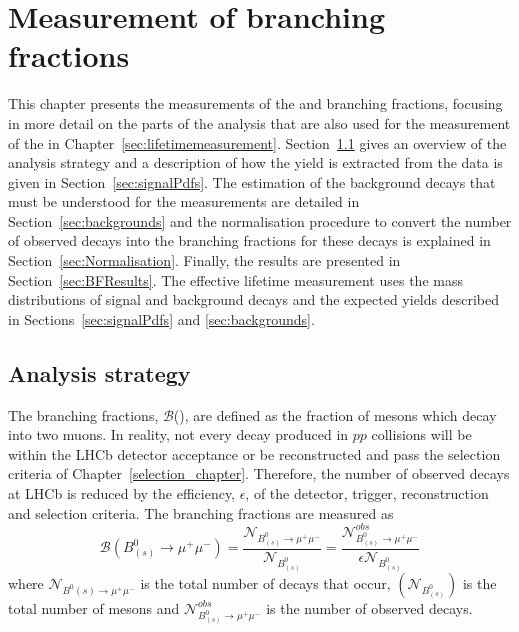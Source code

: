 \chapter{\bf{Measurement of }\boldmath{\bmumu}\bf{ branching fractions}}
\label{sec:BFanalysis}
This chapter presents the measurements of the \bdmumu and \bsmumu branching fractions, focusing in more detail on the parts of the analysis that are also used for the measurement of the \el in Chapter~\ref{sec:lifetimemeasurement}. Section~\ref{sec:BFAnalysisStrategy} gives an overview of the analysis strategy and a description of how the \bmumu yield is extracted from the data is given in Section~\ref{sec:signalPdfs}. The estimation of the background decays that must be understood for the \BF measurements are detailed in Section~\ref{sec:backgrounds} and the normalisation procedure to convert the number of observed \bmumu decays into the branching fractions for these decays is explained in Section~\ref{sec:Normalisation}. Finally, the results are presented in Section~\ref{sec:BFResults}. 
The \bsmumu effective lifetime measurement uses the mass distributions of signal and background decays and the expected yields described in Sections~\ref{sec:signalPdfs} and \ref{sec:backgrounds}. 

\section{Analysis strategy} 
\label{sec:BFAnalysisStrategy}
The \bmumu branching fractions, $\mathcal{B}$(\bmumu), are defined as the fraction of \bs mesons which decay into two muons.
In reality, not every \bmumu decay produced in $pp$ collisions will be within the LHCb detector acceptance or be reconstructed and pass the selection criteria of Chapter~\ref{selection_chapter}. Therefore, the number of observed \bmumu decays at LHCb is reduced by the efficiency, $\epsilon$, of the detector, trigger, reconstruction and selection criteria.
The \bmumu branching fractions are measured as
\begin{equation}
\mathcal{B}(B^{0}_{(s)} \to \mu^{+} \mu^{-}) = \frac{\mathcal{N}_{B^{0}_{(s)} \to \mu^{+} \mu^{-}}}{\mathcal{N}_{B^{0}_{(s)}}} = \frac{ \mathcal{N}^{obs}_{B^{0}_{(s)} \to \mu^{+} \mu^{-}}}{ \epsilon \mathcal{N}_{B^{0}_{(s)}}}
\label{eq:BFdef}
\end{equation}
where $\mathcal{N}_{B^{0}{(s)} \to \mu^{+} \mu^{-}}$ is the total number of \bmumu decays that occur, $(\mathcal{N}_{B^{0}_{(s)}})$ is the total number of \bsd mesons and $\mathcal{N}^{obs}_{B^{0}_{(s)} \to \mu^{+} \mu^{-}}$ is the number of observed \bmumu decays.


